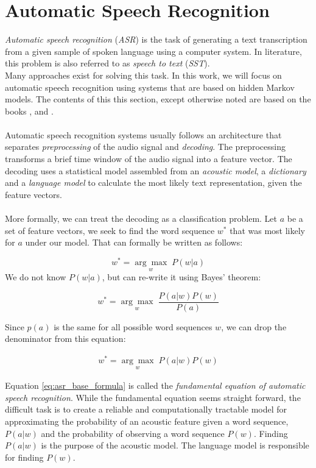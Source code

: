 
\section{Automatic Speech Recognition}
\label{ch:HMM_ASR}
\textit{Automatic speech recognition} (\textit{ASR}) is the task of generating a text transcription from a given sample of spoken language using a computer system. In literature, this problem is also referred to as \textit{speech to text} (\textit{SST}). \\
Many approaches exist for solving this task. In this work, we will focus on automatic speech recognition using systems that are based on hidden Markov models. The contents of this this section, except otherwise noted are based on the books \cite{schukat1995automatische}, \cite{huang2001spoken} and \cite{yu2016automatic}. \\ \\
Automatic speech recognition systems usually follows an architecture that separates \textit{preprocessing} of the audio signal and \textit{decoding}. The preprocessing transforms a brief time window of the audio signal into a feature vector. The decoding uses a statistical model assembled from an \textit{acoustic model}, a \textit{dictionary} and a \textit{language model} to calculate the most likely text representation, given the feature vectors.\\ \\

More formally, we can treat the decoding as a classification problem. Let $a$ be a set of feature vectors, we seek to find the word sequence $w^*$ that was most likely for $a$ under our model. That can formally be written as follows:

\[
w^* = \underset{w}{\arg \max} \; P(w|a)
\] 
We do not know $P(w|a)$, but can re-write it using Bayes' theorem:

\[
w^* = \underset{w}{\arg \max} \; \frac{P(a|w) P(w)}{P(a)}
\]

Since $p(a)$ is the same for all possible word sequences $w$, we can drop the denominator from this equation:

\begin{align}
w^* = \underset{w}{\arg \max} \; P(a|w) P(w)
\label{eq:asr_base_formula}
\end{align}

Equation \ref{eq:asr_base_formula} is called the \textit{fundamental equation of automatic speech recognition}. While the fundamental equation seems straight forward, the difficult task is to create a reliable and computationally tractable model for approximating the probability of an acoustic feature given a word sequence, $P(a|w)$ and the probability of observing a word sequence $P(w)$. Finding $P(a|w)$ is the purpose of the acoustic model. The language model is responsible for finding $P(w)$. 

